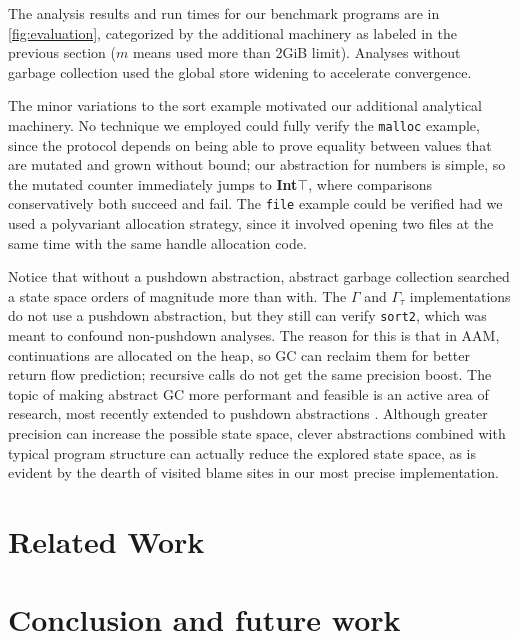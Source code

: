 The analysis results and run times for our benchmark programs are in \autoref{fig:evaluation}, categorized by the additional machinery as labeled in the previous section ($m$ means used more than 2GiB limit).
%
Analyses without garbage collection used the global store widening to accelerate convergence.

The minor variations to the sort example motivated our additional analytical machinery.
%
No technique we employed could fully verify the {\tt malloc} example, since the protocol depends on being able to prove equality between values that are mutated and grown without bound; our abstraction for numbers is simple, so the mutated counter immediately jumps to \textbf{Int}$\top$, where comparisons conservatively both succeed and fail.
%
The {\tt file} example could be verified had we used a polyvariant allocation strategy, since it involved opening two files at the same time with the same handle allocation code.

Notice that without a pushdown abstraction, abstract garbage collection searched a state space orders of magnitude more than with.
%
The $\Gamma$ and $\Gamma_\tau$ implementations do not use a pushdown abstraction, but they still can verify {\tt sort2}, which was meant to confound non-pushdown analyses.
%
The reason for this is that in AAM, continuations are allocated on the heap, so GC can reclaim them for better return flow prediction; recursive calls do not get the same precision boost.
%
The topic of making abstract GC more performant and feasible is an active area of research, most recently extended to pushdown abstractions \citep{dvanhorn:Earl2012Introspective}.
%
Although greater precision can increase the possible state space, clever abstractions combined with typical program structure can actually reduce the explored state space, as is evident by the dearth of visited blame sites in our most precise implementation.

\section{Related Work}\label{sec:related}


\section{Conclusion and future work} \label{sec:conclusion}

